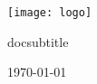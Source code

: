 \begin{titlepage}
	\centering
    \texttt{[image: logo]}\par
	\vspace{4cm}
	{\huge\bfseries\doctitle\par}
	\ifcsname docsubtitle\endcsname
		\vspace{0.5cm}
		{\LARGE\docsubtitle\par}
	\fi
	\vspace{2cm}
	{\Large\itshape\docauthor\par}
	\vfill
	{\large\today\par}
\end{titlepage}